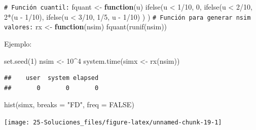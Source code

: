 \documentclass[
]{book}
\newenvironment{Shaded}{\begin{snugshade}}{\end{snugshade}}
\newcommand{\AttributeTok}[1]{\textcolor[rgb]{0.77,0.63,0.00}{#1}}
\newcommand{\CommentTok}[1]{\textcolor[rgb]{0.56,0.35,0.01}{\textit{#1}}}
\newcommand{\ConstantTok}[1]{\textcolor[rgb]{0.00,0.00,0.00}{#1}}
\newcommand{\ControlFlowTok}[1]{\textcolor[rgb]{0.13,0.29,0.53}{\textbf{#1}}}
\newcommand{\DecValTok}[1]{\textcolor[rgb]{0.00,0.00,0.81}{#1}}
\newcommand{\FunctionTok}[1]{\textcolor[rgb]{0.00,0.00,0.00}{#1}}
\newcommand{\NormalTok}[1]{#1}
\newcommand{\OtherTok}[1]{\textcolor[rgb]{0.56,0.35,0.01}{#1}}
\newcommand{\SpecialCharTok}[1]{\textcolor[rgb]{0.00,0.00,0.00}{#1}}
\newcommand{\StringTok}[1]{\textcolor[rgb]{0.31,0.60,0.02}{#1}}
\theoremstyle{break}
\theoremstyle{nonumberplain}
\renewcommand{\CommentTok}[1]{\textcolor[rgb]{0.41,0.41,0.41}{\texttt{#1}}}
\begin{document}
\begin{enumerate}
\begin{Shaded}
\begin{Highlighting}[]
\CommentTok{\# Función cuantil:}
\NormalTok{fquant }\OtherTok{\textless{}{-}} \ControlFlowTok{function}\NormalTok{(u) }
  \FunctionTok{ifelse}\NormalTok{(u }\SpecialCharTok{\textless{}} \DecValTok{1}\SpecialCharTok{/}\DecValTok{10}\NormalTok{, }\DecValTok{0}\NormalTok{,}
         \FunctionTok{ifelse}\NormalTok{(u }\SpecialCharTok{\textless{}} \DecValTok{2}\SpecialCharTok{/}\DecValTok{10}\NormalTok{, }\DecValTok{2}\SpecialCharTok{*}\NormalTok{(u }\SpecialCharTok{{-}} \DecValTok{1}\SpecialCharTok{/}\DecValTok{10}\NormalTok{),}
                \FunctionTok{ifelse}\NormalTok{(u }\SpecialCharTok{\textless{}} \DecValTok{3}\SpecialCharTok{/}\DecValTok{10}\NormalTok{, }\DecValTok{1}\SpecialCharTok{/}\DecValTok{5}\NormalTok{, u }\SpecialCharTok{{-}} \DecValTok{1}\SpecialCharTok{/}\DecValTok{10}\NormalTok{) ) )}
\CommentTok{\# Función para generar nsim valores:}
\NormalTok{rx }\OtherTok{\textless{}{-}} \ControlFlowTok{function}\NormalTok{(nsim) }\FunctionTok{fquant}\NormalTok{(}\FunctionTok{runif}\NormalTok{(nsim))}
\end{Highlighting}
\end{Shaded}

  Ejemplo:

\begin{Shaded}
\begin{Highlighting}[]
\FunctionTok{set.seed}\NormalTok{(}\DecValTok{1}\NormalTok{)}
\NormalTok{nsim }\OtherTok{\textless{}{-}} \DecValTok{10}\SpecialCharTok{\^{}}\DecValTok{4}
\FunctionTok{system.time}\NormalTok{(simx }\OtherTok{\textless{}{-}} \FunctionTok{rx}\NormalTok{(nsim))}
\end{Highlighting}
\end{Shaded}

\begin{verbatim}
##    user  system elapsed 
##       0       0       0
\end{verbatim}

\begin{Shaded}
\begin{Highlighting}[]
\FunctionTok{hist}\NormalTok{(simx, }\AttributeTok{breaks =} \StringTok{"FD"}\NormalTok{, }\AttributeTok{freq =} \ConstantTok{FALSE}\NormalTok{)}
\end{Highlighting}
\end{Shaded}

  \begin{center}\texttt{[image: 25-Soluciones\_files/figure-latex/unnamed-chunk-19-1]} \end{center}


\end{enumerate}
\end{document}
